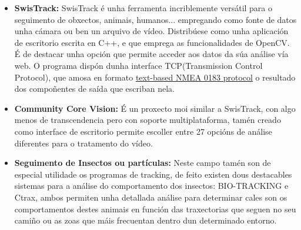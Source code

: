         \begin{itemize}
         \item \textbf{SwisTrack:}\cite{SwisTrack-webPage}
            SwisTrack é unha ferramenta incriblemente versátil para o seguimento de obxectos, 
            animais, humanos... empregando como fonte de datos unha cámara ou ben un arquivo de 
            vídeo. Distribúese como unha aplicación de escritorio escrita en C++, e que emprega as 
            funcionalidades de OpenCV.
            É de destacar unha opción que permite acceder aos datos da súa análise vía web. O 
            programa dispón dunha interface TCP(Transmission Control Protocol), que amosa en formato
            \underline{text-based NMEA 0183 protocol} o resultado dos compoñentes de saída que 
            escriban nela.
            
         \item \textbf{Community Core Vision:}\cite{ccv-webPage}
            É un proxecto moi similar a SwisTrack, con algo menos de transcendencia pero con 
            soporte multiplataforma, tamén creado como interface de escritorio permite escoller 
            entre 27 opcións de análise diferentes para o tratamento do vídeo.
            
        \item \textbf{Seguimento de Insectos ou partículas:}
            Neste campo tamén son de especial utilidade os programas de tracking, de feito existen 
            dous destacables sistemas para a análise do comportamento dos insectos: BIO-TRACKING
            \cite{bio-tracking-webPage} e Ctrax\cite{ctrax-webPage}, ambos permiten unha detallada
            análise para determinar cales son os comportamentos destes animais en función das
            traxectorias que seguen no seu camiño ou as zoas que máis frecuentan dentro dun
            determinado entorno.
        \end{itemize}
